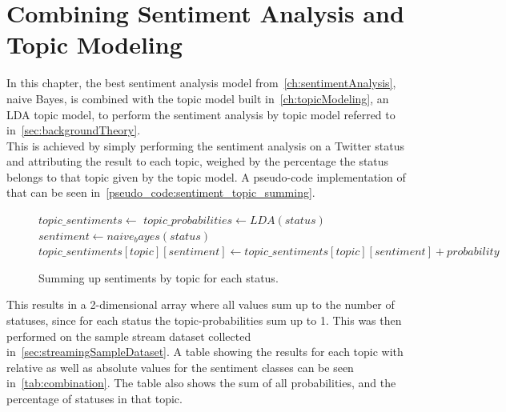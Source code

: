 \chapter{Combining Sentiment Analysis and Topic Modeling}
\label{ch:combiningSentimentAnalysisAndTopicModeling}


In this chapter, the best sentiment analysis model from~\autoref{ch:sentimentAnalysis}, naive Bayes,
is combined with the topic model built in~\autoref{ch:topicModeling}, an LDA topic model,
to perform the sentiment analysis by topic model referred to in~\autoref{sec:backgroundTheory}.
\\
This is achieved by simply performing the sentiment analysis on a Twitter status and attributing the result to each topic,
weighed by the percentage the status belongs to that topic given by the topic model.
A pseudo-code implementation of that can be seen in~\autoref{pseudo_code:sentiment_topic_summing}.

\begin{figure}
    \caption{Summing up sentiments by topic for each status.}
    \label{pseudo_code:sentiment_topic_summing}
    \begin{algorithmic}
        \State $topic\_sentiments \gets {}$ %
            \State $topic\_probabilities \gets LDA(status)$
            \State $sentiment \gets naive_bayes(status)$
                \State $topic\_sentiments[topic][sentiment]
                    \gets topic\_sentiments[topic][sentiment] + probability$
            \EndFor
        \EndFor
    \end{algorithmic}
\end{figure}

This results in a 2-dimensional array where all values sum up to the number of statuses,
since for each status the topic-probabilities sum up to 1.
This was then performed on the sample stream dataset collected in~\autoref{sec:streamingSampleDataset}.
A table showing the results for each topic with relative as well as absolute values for the sentiment classes  can be seen in~\autoref{tab:combination}.
The table also shows the sum of all probabilities, and the percentage of statuses in that topic.


